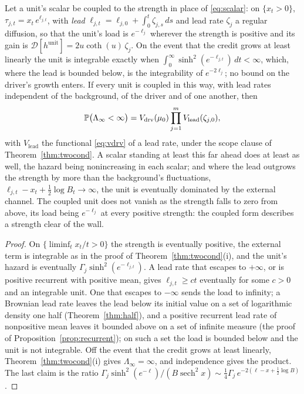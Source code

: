\begin{corollary}\label{cor:lead}
Let a unit's scalar be coupled to the strength in place of
\eqref{eq:scalar}: on $\{x_t>0\}$, $\tau_{j,t}=x_t\,e^{\ell_{j,t}}$, with
\emph{lead} $\ell_{j,t}=\ell_{j,0}+\int_0^t\zeta_{j,s}\,ds$ and lead rate
$\zeta_j$ a regular diffusion, so that the unit's load is $e^{-\ell_j}$
wherever the strength is positive and its gain is
$\mathcal D[h^{\mathrm{unit}}]=2u\coth(u)\,\zeta_j$. On the event that the
credit grows at least linearly the unit is integrable exactly when
$\int_0^\infty\sinh^2(e^{-\ell_{j,t}})\,dt<\infty$, which, where the lead is
bounded below, is the integrability of $e^{-2\ell_j}$; no bound on the
driver's growth enters. If every unit is coupled in this way, with lead
rates independent of the background, of the driver and of one another,
then
\begin{equation}\label{eq:lead}
\mathbb{P}\bigl(\Lambda_\infty<\infty\bigr)
=V_{\mathrm{drv}}(\mu_0)\prod_{j=1}^mV_{\mathrm{lead}}(\zeta_{j,0}),
\end{equation}
with $V_{\mathrm{lead}}$ the functional \eqref{eq:vdrv} of a lead rate,
under the scope clause of Theorem~\ref{thm:twocond}. A scalar standing at
least this far ahead does at least as well, the hazard being
nonincreasing in each scalar; and where the lead outgrows the strength by
more than the background's fluctuations,
$\ell_{j,t}-x_t+\tfrac12\log B_t\to\infty$, the unit is eventually
dominated by the external channel. The coupled unit does not vanish as
the strength falls to zero from above, its load being $e^{-\ell_j}$ at
every positive strength: the coupled form describes a strength clear of
the wall.
\end{corollary}

\begin{proof}
On $\{\liminf_tx_t/t>0\}$ the strength is eventually positive, the
external term is integrable as in the proof of
Theorem~\ref{thm:twocond}(i), and the unit's hazard is eventually
$\Gamma_j\sinh^2(e^{-\ell_{j,t}})$. A lead rate that escapes to
$+\infty$, or is positive recurrent with positive mean, gives
$\ell_{j,t}\ge ct$ eventually for some $c>0$ and an integrable unit. One
that escapes to $-\infty$ sends the load to infinity; a Brownian lead rate
leaves the lead below its initial value on a set of logarithmic density
one half (Theorem~\ref{thm:half}), and a positive recurrent lead rate of
nonpositive mean leaves it bounded above on a set of infinite measure (the
proof of Proposition~\ref{prop:recurrent}); on such a set the load is
bounded below and the unit is not integrable. Off the event that the
credit grows at least linearly, Theorem~\ref{thm:twocond}(i) gives
$\Lambda_\infty=\infty$, and independence gives the product. The last
claim is the ratio
$\Gamma_j\sinh^2(e^{-\ell})/(B\operatorname{sech}^2x)\sim
\tfrac14\Gamma_j\,e^{-2(\ell-x+\frac12\log B)}$.
\end{proof}

